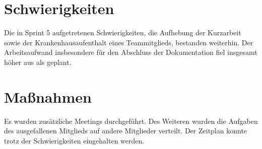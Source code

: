 \documentclass[a4paper,11pt,listof=numbered,glossary=totoc,parskip=half,toc=bib]{scrreprt}
\begin{document}
    \section{Schwierigkeiten}
    Die in Sprint 5 aufgetretenen Schwierigkeiten, die Aufhebung der Kurzarbeit sowie der Krankenhausaufenthalt eines Teammitglieds, bestanden weiterhin. Der Arbeitsaufwand insbesondere für den Abschluss der Dokumentation fiel insgesamt höher aus als geplant. 
    
    \section{Maßnahmen}
Es wurden zusätzliche Meetings durchgeführt. Des Weiteren wurden die Aufgaben des ausgefallenen Mitglieds auf andere Mitglieder verteilt. Der Zeitplan konnte trotz der Schwierigkeiten eingehalten werden.

	
	\newpage	
	\setcounter{chapter}{\thelastRomanCounter} %
\renewcommand \thechapter{\Roman{chapter}}	\printbibliography[heading=bibnumbered,title=Literaturverzeichnis]
\end{document}
